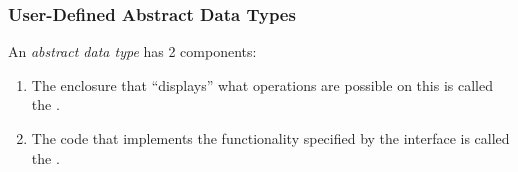 \subsubsection{User-Defined Abstract Data Types}\label{subsubsec:User_Defined_Abstract_Data_Types}
\begin{definition}\label{def:Abstract_Data_Type}
  An \emph{abstract data type} has 2 components:
  \begin{enumerate}[noitemsep]
  \item The enclosure that ``displays'' what operations are possible on this  is called the .
  \item The code that implements the functionality specified by the interface is called the .
  \end{enumerate}


\end{definition}
